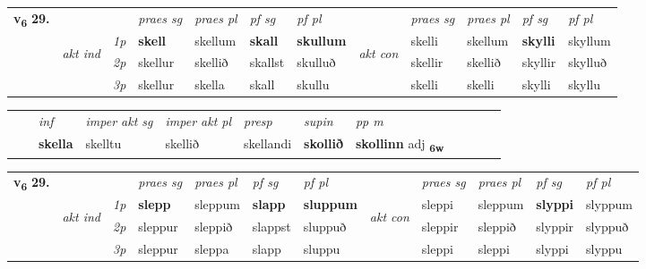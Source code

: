 \begin{tabular}{llllllllllll} \toprule
\multirow{4}{*}{{{\textbf{v{\textsubscript{6}}} \Large{\textbf{29.}}}}}  & &   &  \textit{praes sg}  & \textit{praes pl}  &\textit{ pf sg} & \textit{pf pl} &  &  \textit{praes sg}  & \textit{praes pl}  & \textit{pf sg} & \textit{pf pl } \\*
	\cmidrule{4-7} \cmidrule{9-12}
 & \multirow{3}{*}{\begin{turn}{90}\textit{akt ind}\end{turn}} & {\textit{1p}} & \textbf{skell} & skellum    & \textbf{skall} & \textbf{skullum} & \multirow{3}{*}{\begin{turn}{90}\textit{akt con}\end{turn}} &skelli & skellum & \textbf{skylli} & skyllum\\*
& &  {\textit{2p}} &  skellur  & skellið   & skallst & skulluð & & skellir & skellið & skyllir & skylluð \\*
& &  {\textit{3p}} & skellur & skella   & skall & skullu & & skelli & skelli& skylli & skyllu  \\*
\cmidrule{4-7} \cmidrule{9-12}
\end{tabular}


\begin{tabular}{llllllllllll}
 & & \textit{inf} & \textit{imper akt sg} & \textit{imper akt pl}   & \textit{presp} & \textit{supin}  & \textit{pp m}     \\*
  & & \textbf{skella} & skelltu  & skellið   & skellandi &  \textbf{skollið}  & \textbf{skollinn} adj \textbf{\textsubscript{6w}} \\*
\cmidrule{1-12}
\end{tabular}



\begin{tabular}{llllllllllll} \toprule
\multirow{4}{*}{{{\textbf{v{\textsubscript{6}}} \Large{\textbf{29.}}}}}  & &   &  \textit{praes sg}  & \textit{praes pl}  &\textit{ pf sg} & \textit{pf pl} &  &  \textit{praes sg}  & \textit{praes pl}  & \textit{pf sg} & \textit{pf pl } \\*
	\cmidrule{4-7} \cmidrule{9-12}
 & \multirow{3}{*}{\begin{turn}{90}\textit{akt ind}\end{turn}} & {\textit{1p}} & \textbf{slepp} & sleppum    & \textbf{slapp} & \textbf{sluppum} & \multirow{3}{*}{\begin{turn}{90}\textit{akt con}\end{turn}} &sleppi & sleppum & \textbf{slyppi} & slyppum\\*
& &  {\textit{2p}} &  sleppur  & sleppið   & slappst & sluppuð & & sleppir & sleppið & slyppir & slyppuð \\*
& &  {\textit{3p}} & sleppur & sleppa   & slapp & sluppu & & sleppi & sleppi& slyppi & slyppu  \\*
\cmidrule{4-7} \cmidrule{9-12}
\end{tabular}


